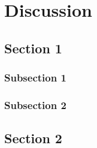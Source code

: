 
\chapter{Discussion} %

\label{chap:discussion} %


\section{Section 1}

\subsection{Subsection 1}



\subsection{Subsection 2}


\section{Section 2}

